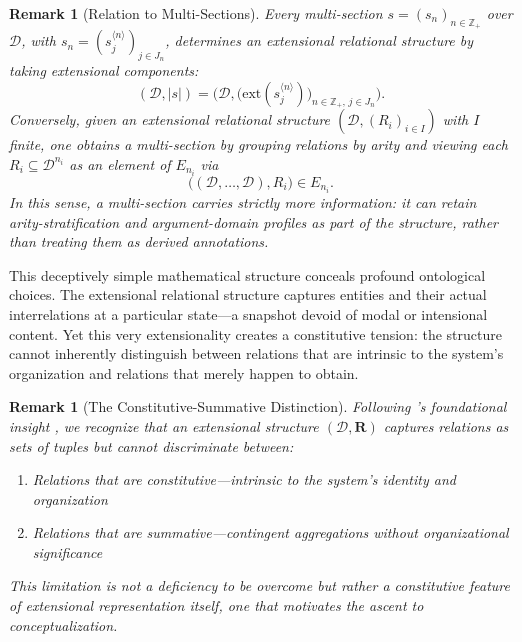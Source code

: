\documentclass[12pt,a4paper]{article}
\newtheorem{remark}[definition]{Remark}
\newcommand{\domain}{\mathcal{D}}
\begin{document}
\begin{remark}[Relation to Multi-Sections]
Every multi-section $s=(s_n)_{n\in \mathbb{Z}_+}$ over $\domain$, with $s_n=(s^{\langle n\rangle}_j)_{j\in J_n}$, determines an extensional relational structure by taking extensional components:
$$
(\domain, |s|) = \Big(\domain,\big(\mathrm{ext}(s^{\langle n\rangle}_j)\big)_{n\in \mathbb{Z}_+,\, j\in J_n}\Big).
$$
Conversely, given an extensional relational structure $(\domain,(R_i)_{i\in I})$ with $I$ finite, one obtains a multi-section by grouping relations by arity and viewing each $R_i\subseteq \domain^{n_i}$ as an element of $E_{n_i}$ via
$$
\big((\domain,\dots,\domain),R_i\big)\in E_{n_i}.
$$
In this sense, a multi-section carries strictly more information: it can retain arity-stratification and argument-domain profiles as part of the structure, rather than treating them as derived annotations.
\end{remark}

This deceptively simple mathematical structure conceals profound ontological choices. The extensional relational structure captures entities and their actual interrelations at a particular state---a snapshot devoid of modal or intensional content. Yet this very extensionality creates a constitutive tension: the structure cannot inherently distinguish between relations that are intrinsic to the system's organization and relations that merely happen to obtain.

\begin{remark}[The Constitutive-Summative Distinction]
Following \citeauthor{bertalanffy1968}'s foundational insight \citep{bertalanffy1968}, we recognize that an extensional structure $(\domain, \mathbf{R})$ captures relations as sets of tuples but cannot discriminate between:
\begin{enumerate}
    \item Relations that are \emph{constitutive}---intrinsic to the system's identity and organization
    \item Relations that are \emph{summative}---contingent aggregations without organizational significance
\end{enumerate}
This limitation is not a deficiency to be overcome but rather a constitutive feature of extensional representation itself, one that motivates the ascent to conceptualization.
\end{remark}
\end{document}
